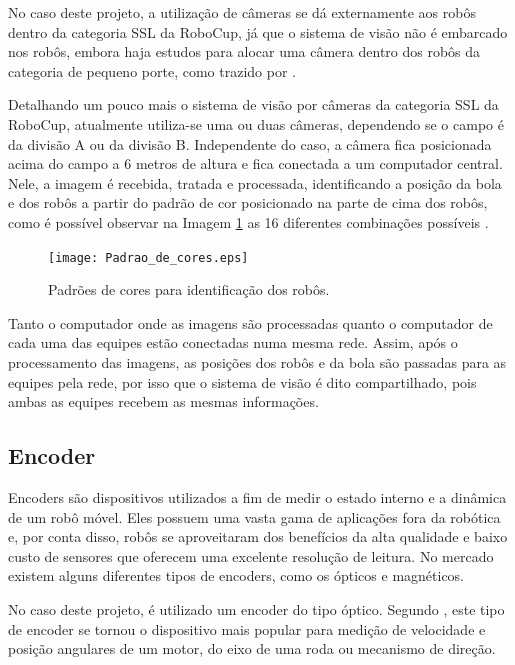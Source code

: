 \documentclass[acronym, symbols, table]{fei}
\begin{document}
				No caso deste projeto, a utilização de câmeras se dá externamente aos robôs dentro da categoria SSL da RoboCup, já que o sistema de visão não é embarcado nos robôs, embora haja estudos para alocar uma câmera dentro dos robôs da categoria de pequeno porte, como trazido por \textcite{melo2022embedded}.
				
				Detalhando um pouco mais o sistema de visão por câmeras da categoria SSL da RoboCup, atualmente utiliza-se uma ou duas câmeras, dependendo se o campo é da divisão A ou da divisão B. Independente do caso, a câmera fica posicionada acima do campo a 6 metros de altura e fica conectada a um computador central. Nele, a imagem é recebida, tratada e processada, identificando a posição da bola e dos robôs a partir do padrão de cor posicionado na parte de cima dos robôs, como é possível observar na Imagem \ref{fig:color_patterns} as 16 diferentes combinações possíveis \cite{10.1007/978-3-642-11876-0_37}.
				
				\begin{figure}[!htb]
					\centering
					\caption{Padrões de cores para identificação dos robôs.} 
					\texttt{[image: Padrao\_de\_cores.eps]}
					\label{fig:color_patterns}
				\end{figure}
			
				Tanto o computador onde as imagens são processadas quanto o computador de cada uma das equipes estão conectadas numa mesma rede. Assim, após o processamento das imagens, as posições dos robôs e da bola são passadas para as equipes pela rede, por isso que o sistema de visão é dito compartilhado, pois ambas as equipes recebem as mesmas informações.
			
			\subsection{Encoder}\label{sec:sensores_encoders}
				
				Encoders são dispositivos utilizados a fim de medir o estado interno e a dinâmica de um robô móvel. Eles possuem uma vasta gama de aplicações fora da robótica e, por conta disso, robôs se aproveitaram dos benefícios da alta qualidade e baixo custo de sensores que oferecem uma excelente resolução de leitura. No mercado existem alguns diferentes tipos de encoders, como os ópticos e magnéticos. 
				
				No caso deste projeto, é utilizado um encoder do tipo óptico. Segundo \textcite{siegwart2011introduction}, este tipo de encoder se tornou o dispositivo mais popular para medição de velocidade e posição angulares de um motor, do eixo de uma roda ou mecanismo de direção.
				
\end{document}
